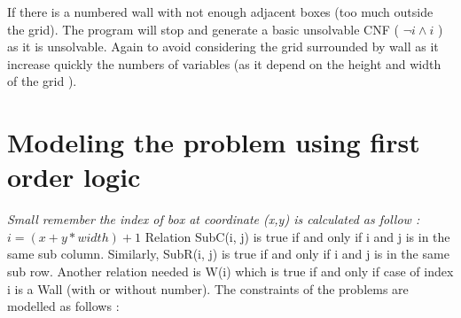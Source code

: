 \documentclass[a4paper]{article}
\begin{document}
\medskip

If there is a numbered wall with not enough adjacent boxes (too much outside the grid). The program will stop and generate a basic unsolvable CNF ( $\neg i \land i $ ) as it is unsolvable. Again to avoid considering the grid surrounded by wall as it increase quickly the numbers of variables (as it depend on the height and width of the grid ).
\newline



\section{Modeling the problem using first order logic}
\textit{Small remember the index of box at coordinate (x,y) is calculated as follow : $i = (x+y*width)+1$}
Relation SubC(i, j) is true if and only if i and j is in the same sub column. Similarly, SubR(i, j) is true if and only if i and j is in the same sub row. Another relation needed is W(i) which is true if and only if case of index i is a Wall (with or without number).  The constraints of the problems are modelled as follows :
\end{document}
